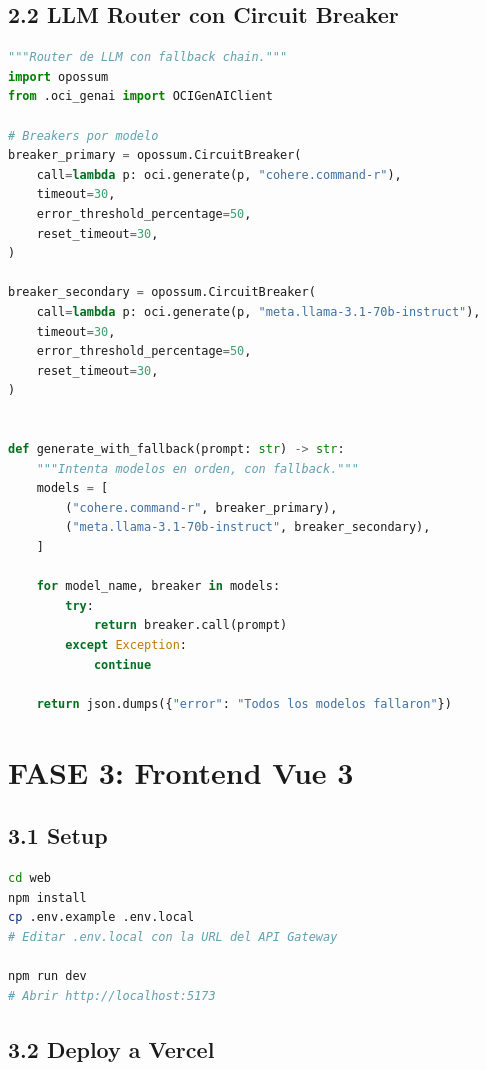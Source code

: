 \documentclass[11pt,a4paper]{article}
\begin{document}
\subsection{2.2 LLM Router con Circuit Breaker}

\begin{lstlisting}[language=Python, caption={src/services/llm\_router.py}]
"""Router de LLM con fallback chain."""
import opossum
from .oci_genai import OCIGenAIClient

# Breakers por modelo
breaker_primary = opossum.CircuitBreaker(
    call=lambda p: oci.generate(p, "cohere.command-r"),
    timeout=30,
    error_threshold_percentage=50,
    reset_timeout=30,
)

breaker_secondary = opossum.CircuitBreaker(
    call=lambda p: oci.generate(p, "meta.llama-3.1-70b-instruct"),
    timeout=30,
    error_threshold_percentage=50,
    reset_timeout=30,
)


def generate_with_fallback(prompt: str) -> str:
    """Intenta modelos en orden, con fallback."""
    models = [
        ("cohere.command-r", breaker_primary),
        ("meta.llama-3.1-70b-instruct", breaker_secondary),
    ]

    for model_name, breaker in models:
        try:
            return breaker.call(prompt)
        except Exception:
            continue

    return json.dumps({"error": "Todos los modelos fallaron"})
\end{lstlisting}

\section{FASE 3: Frontend Vue 3}

\subsection{3.1 Setup}

\begin{lstlisting}[language=Bash, caption={Setup del frontend}]
cd web
npm install
cp .env.example .env.local
# Editar .env.local con la URL del API Gateway

npm run dev
# Abrir http://localhost:5173
\end{lstlisting}

\subsection{3.2 Deploy a Vercel}
\end{document}
